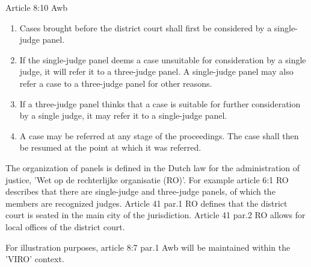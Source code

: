 \documentclass[10pt,a4paper]{report}              %
\theoremstyle{plain}\theorembodyfont{\rmfamily}\newtheorem{definition}{Definition}[section]
\theoremstyle{plain}\theorembodyfont{\rmfamily}\newtheorem{designrule}[definition]{Requirement}
\begin{document}
Article 8:10 Awb

\begin{enumerate}[1.]
\item
  Cases brought before the district court shall first be considered by a
  single-judge panel.
\item
  If the single-judge panel deems a case unsuitable for consideration by
  a single judge, it will refer it to a three-judge panel. A
  single-judge panel may also refer a case to a three-judge panel for
  other reasons.
\item
  If a three-judge panel thinks that a case is suitable for further
  consideration by a single judge, it may refer it to a single-judge
  panel.
\item
  A case may be referred at any stage of the proceedings. The case shall
  then be resumed at the point at which it was referred.
\end{enumerate}
The organization of panels is defined in the Dutch law for the
administration of justice, 'Wet op de rechterlijke organisatie (RO)'.
For example article 6:1 RO describes that there are single-judge and
three-judge panels, of which the members are recognized judges. Article
41 par.1 RO defines that the district court is seated in the main city
of the jurisdiction. Article 41 par.2 RO allows for local offices of the
district court.

For illustration purposes, article 8:7 par.1 Awb will be maintained
within the 'VIRO' context.
\end{document}
